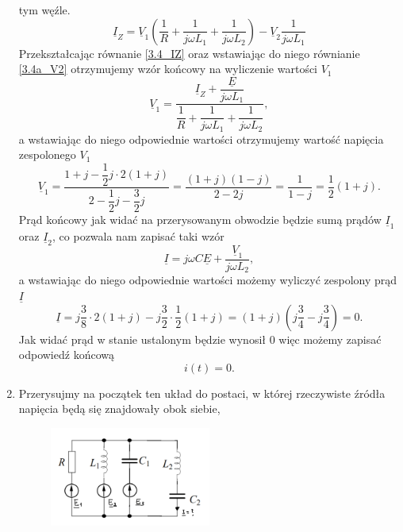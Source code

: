 \documentclass[12pt, a4paper]{article}
\begin{document}
\begin{enumerate}[label=\alph*)]
        tym węźle.
        \begin{equation}\label{3.4_IZ}
          \underline{I}_Z = \underline{V}_1 \left(\frac{1}{R}+
          \frac{1}{j\omega L_1}+\frac{1}{j\omega L_2}\right) - \underline{V}_2
          \frac{1}{j\omega L_1}
        \end{equation}
        Przekształcając równanie \ref{3.4_IZ} oraz wstawiając do niego równianie \ref{3.4a_V2}
        otrzymujemy wzór końcowy na wyliczenie wartości $V_1$
        \begin{equation*}
          \underline{V}_1 = \frac{\underline{I}_Z+\dfrac{\underline{E}}{j\omega L_1}}
          {\dfrac{1}{R}+\dfrac{1}{j\omega L_1}+\dfrac{1}{j\omega L_2}},
        \end{equation*}
        a wstawiając do niego odpowiednie wartości otrzymujemy wartość napięcia zespolonego
        $V_1$
        \begin{equation*}
          \underline{V}_1 = \frac{1+j-\dfrac{1}{2}j\cdot2(1+j)}
          {2-\dfrac{1}{2}j-\dfrac{3}{2}j} = \frac{(1+j)(1-j)}{2-2j} = \frac{1}{1-j}
          = \frac{1}{2}(1+j).
        \end{equation*}
        Prąd końcowy jak widać na przerysowanym obwodzie będzie sumą prądów
        $\underline{I}_1$ oraz $\underline{I}_2$, co pozwala nam zapisać taki wzór
        \begin{equation*}
          \underline{I} = j\omega C\underline{E} + \frac{\underline{V}_1}{j\omega L_2},
        \end{equation*}
        a wstawiając do niego odpowiednie wartości możemy wyliczyć zespolony prąd
        $\underline{I}$
        \begin{equation*}
          \underline{I} = j\frac{3}{8}\cdot2(1+j)-j\frac{3}{2}\cdot\frac{1}{2}
          (1+j) = (1+j)\left(j\frac{3}{4}-j\frac{3}{4}\right) = 0.
        \end{equation*}
        Jak widać prąd w stanie ustalonym będzie wynosił $0$ więc możemy zapisać
        odpowiedź końcową
        \begin{equation*}
          i(t) = 0.
        \end{equation*}
  \item Przerysujmy na początek ten układ do postaci, w której rzeczywiste źródła
        napięcia będą się znajdowały obok siebie,
        \begin{figure}[H]
          \centering
          \includegraphics[width = 0.5\textwidth]{./images/Lista_3/3.4.2.png}

\end{figure}
\end{enumerate}
\end{document}
